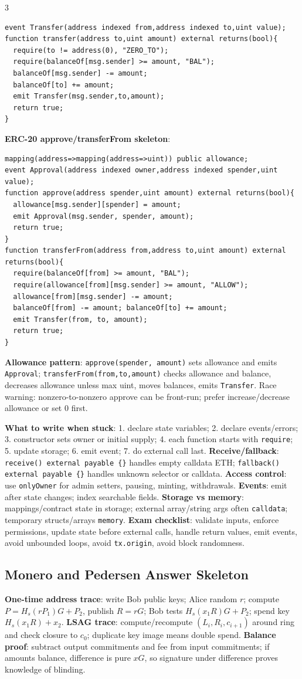 \documentclass[8pt]{extarticle}
\newcommand{\term}[1]{\textbf{#1}}
\begin{document}
\begin{multicols*}{3}
\begin{verbatim}
event Transfer(address indexed from,address indexed to,uint value);
function transfer(address to,uint amount) external returns(bool){
  require(to != address(0), "ZERO_TO");
  require(balanceOf[msg.sender] >= amount, "BAL");
  balanceOf[msg.sender] -= amount;
  balanceOf[to] += amount;
  emit Transfer(msg.sender,to,amount);
  return true;
}
\end{verbatim}
\term{ERC-20 approve/transferFrom skeleton}:
\begin{verbatim}
mapping(address=>mapping(address=>uint)) public allowance;
event Approval(address indexed owner,address indexed spender,uint value);
function approve(address spender,uint amount) external returns(bool){
  allowance[msg.sender][spender] = amount;
  emit Approval(msg.sender, spender, amount);
  return true;
}
function transferFrom(address from,address to,uint amount) external returns(bool){
  require(balanceOf[from] >= amount, "BAL");
  require(allowance[from][msg.sender] >= amount, "ALLOW");
  allowance[from][msg.sender] -= amount;
  balanceOf[from] -= amount; balanceOf[to] += amount;
  emit Transfer(from, to, amount);
  return true;
}
\end{verbatim}
\term{Allowance pattern}: \texttt{approve(spender, amount)} sets allowance and emits \texttt{Approval}; \texttt{transferFrom(from,to,amount)} checks allowance and balance, decreases allowance unless max uint, moves balances, emits \texttt{Transfer}. Race warning: nonzero-to-nonzero approve can be front-run; prefer increase/decrease allowance or set 0 first.

\term{What to write when stuck}: 1. declare state variables; 2. declare events/errors; 3. constructor sets owner or initial supply; 4. each function starts with \texttt{require}; 5. update storage; 6. emit event; 7. do external call last. \term{Receive/fallback}: \texttt{receive() external payable \{\}} handles empty calldata ETH; \texttt{fallback() external payable \{\}} handles unknown selector or calldata. \term{Access control}: use \texttt{onlyOwner} for admin setters, pausing, minting, withdrawals. \term{Events}: emit after state changes; index searchable fields. \term{Storage vs memory}: mappings/contract state in storage; external array/string args often \texttt{calldata}; temporary structs/arrays \texttt{memory}. \term{Exam checklist}: validate inputs, enforce permissions, update state before external calls, handle return values, emit events, avoid unbounded loops, avoid \texttt{tx.origin}, avoid block randomness.

\subsection{Monero and Pedersen Answer Skeleton}
\term{One-time address trace}: write Bob public keys; Alice random $r$; compute $P=H_s(rP_1)G+P_2$, publish $R=rG$; Bob tests $H_s(x_1R)G+P_2$; spend key $H_s(x_1R)+x_2$. \term{LSAG trace}: compute/recompute $(L_i,R_i,c_{i+1})$ around ring and check closure to $c_0$; duplicate key image means double spend. \term{Balance proof}: subtract output commitments and fee from input commitments; if amounts balance, difference is pure $xG$, so signature under difference proves knowledge of blinding.


\end{multicols*}
\end{document}
